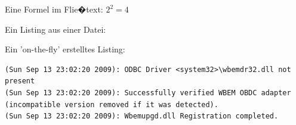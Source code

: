 Eine Formel im Flie�text: $2^2=4$ 

Ein Listing aus einer Datei:
\lstset{language=Java, basicstyle=\footnotesize, showstringspaces=false,tabsize=2}


Ein 'on-the-fly' erstelltes Listing:
\begin{lstlisting}[label=lst:log,caption={Beispiel eines Log-Eintrags}] 
(Sun Sep 13 23:02:20 2009): ODBC Driver <system32>\wbemdr32.dll not present 
(Sun Sep 13 23:02:20 2009): Successfully verified WBEM OBDC adapter (incompatible version removed if it was detected).
(Sun Sep 13 23:02:20 2009): Wbemupgd.dll Registration completed.
\end{lstlisting}


